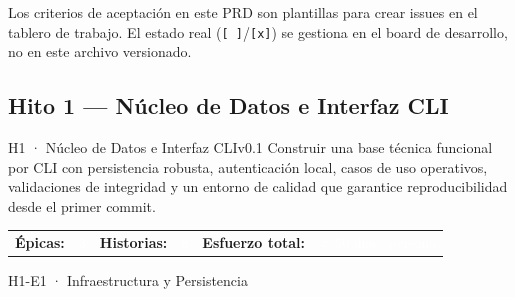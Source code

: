 \documentclass[11pt,a4paper]{article}
\begin{document}
\begin{notebox}
Los criterios de aceptación en este PRD son plantillas para crear issues en el tablero de trabajo. El estado real (\texttt{[ ]}/\texttt{[x]}) se gestiona en el board de desarrollo, no en este archivo versionado.
\end{notebox}

\subsection{Hito 1 — Núcleo de Datos e Interfaz CLI}

\begin{hitobox}{H1 · Núcleo de Datos e Interfaz CLI}{v0.1}
\small\textcolor{accentlight}{%
  Construir una base técnica funcional por CLI con persistencia robusta, autenticación local,
  casos de uso operativos, validaciones de integridad y un entorno de calidad
  que garantice reproducibilidad desde el primer commit.
}
\par\vspace{4pt}
\begin{tabular}{@{}lllll@{}}
  \textcolor{accentlight}{\small\textbf{Épicas:}} & \textcolor{white}{\small 3} &
  \textcolor{accentlight}{\small\textbf{Historias:}} & \textcolor{white}{\small 8} &
  \textcolor{accentlight}{\small\textbf{Esfuerzo total:}} \textcolor{white}{\small~$\approx$50 días·persona}
\end{tabular}
\end{hitobox}

\begin{epicbox}{H1-E1 · Infraestructura y Persistencia}
\end{epicbox}
\end{document}
